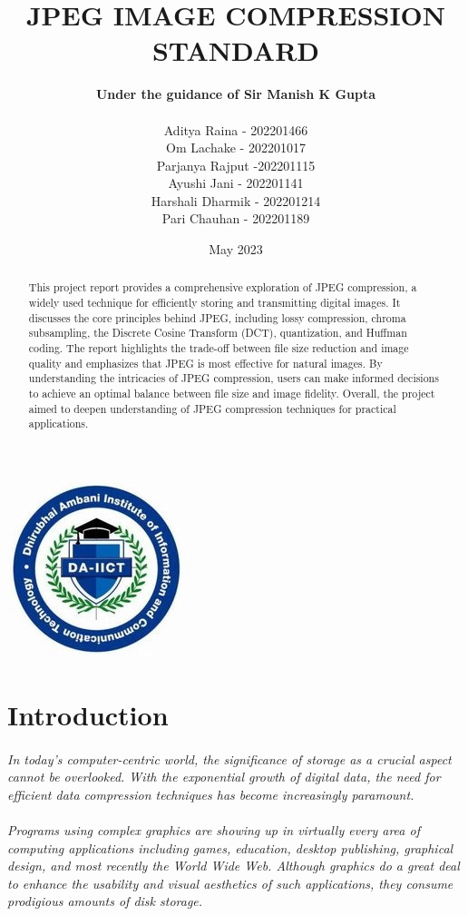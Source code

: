 \documentclass[12pt, letterpaper]{article}
\title{{\color{blue}JPEG IMAGE COMPRESSION STANDARD}}
\author{\textbf{Under the  guidance of Sir Manish K Gupta}\\\\Aditya Raina - 202201466\\Om Lachake - 202201017\\Parjanya Rajput -202201115\\Ayushi Jani - 202201141\\Harshali Dharmik - 202201214\\Pari Chauhan - 202201189}
\date{May 2023}
\begin{document}
\pagestyle{fancy}

\maketitle

\begin{center}
    \includegraphics{DAIICT-Logo} 
\end{center}
\newpage
\fancyfoot[C]{\thepage}
\tableofcontents{}
\newpage
\begin{abstract}
    This project report provides a comprehensive exploration of JPEG compression, a widely used technique for efficiently storing and transmitting digital images. It discusses the core principles behind JPEG, including lossy compression, chroma subsampling, the Discrete Cosine Transform (DCT), quantization, and Huffman coding. The report highlights the trade-off between file size reduction and image quality and emphasizes that JPEG is most effective for natural images. By understanding the intricacies of JPEG compression, users can make informed decisions to achieve an optimal balance between file size and image fidelity. Overall, the project aimed to deepen understanding of JPEG compression techniques for practical applications.
\end{abstract}

\section{{\color{blue}Introduction}}
\paragraph{}\textit{In today's computer-centric world, the significance of storage as a crucial aspect cannot be overlooked. With the exponential growth of digital data, the need for efficient data compression techniques has become increasingly paramount.} 
\paragraph{}\textit{Programs using complex graphics are showing up in virtually every area of computing applications including games, education, desktop publishing, graphical design, and most recently the World Wide Web. Although graphics do a great deal to enhance the usability and visual aesthetics of such applications, they consume prodigious amounts of disk storage.}
\end{document}
